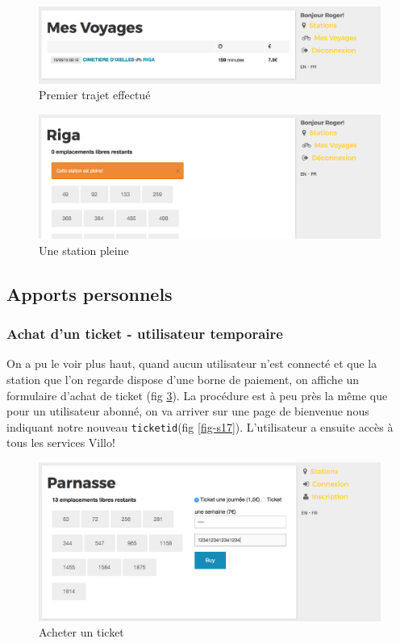 \documentclass[a4paper]{article}
\begin{document}
    \begin{figure}
    \includegraphics[width=\textwidth]{images/s14.png}
    \caption{Premier trajet effectué}
    \label{fig-s14}
    \end{figure}
    
    \begin{figure}
    \includegraphics[width=\textwidth]{images/s15.png}
    \caption{Une station pleine}
    \label{fig-s15}
    \end{figure}
    
    \subsection{Apports personnels}
    
    \subsubsection{Achat d'un ticket - utilisateur temporaire}
    On a pu le voir plus haut, quand aucun utilisateur n'est connecté et que la station que l'on regarde dispose d'une borne de paiement, on affiche un formulaire d'achat de ticket (fig \ref{fig-s16}). La procédure est à peu près la même que pour un utilisateur abonné, on va arriver sur une page de bienvenue nous indiquant notre nouveau \texttt{ticketid}(fig \ref{fig-s17}). L'utilisateur a ensuite accès à tous les services Villo!
    
    \begin{figure}
    \includegraphics[width=\textwidth]{images/s16.png}
    \caption{Acheter un ticket}
    \label{fig-s16}
    \end{figure}
    
\end{document}
